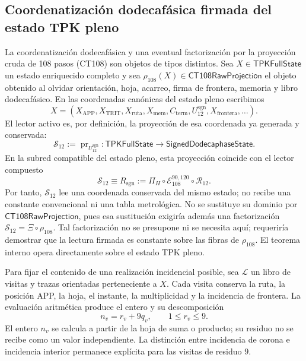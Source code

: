 \subsection{Coordenatización dodecafásica firmada del estado TPK pleno}
\label{subsec:registro-evaluacion-incidencial}

La coordenatización dodecafásica y una eventual factorización por la proyección cruda de
108 pasos (CT108) son objetos de tipos distintos. Sea
\(X\in\mathsf{TPKFullState}\) un estado enriquecido completo y sea
\(\rho_{108}(X)\in\mathsf{CT108RawProjection}\) el objeto obtenido al olvidar
orientación, hoja, acarreo, firma de frontera, memoria y libro dodecafásico.
En las coordenadas canónicas del estado pleno escribimos
\[
 X=(X_{\mathrm{APP}},X_{\mathrm{TRIT}},X_{\mathrm{ruta}},X_{\mathrm{mem}},
       C_{\mathrm{term}},U_{12}^{\mathrm{sgn}},
       X_{\mathrm{frontera}},\ldots).
\]
El lector activo es, por definición, la proyección de esa coordenada ya
generada y conservada:
\[
 \mathcal S_{12}:=\operatorname{pr}_{U_{12}^{\mathrm{sgn}}}:
 \mathsf{TPKFullState}\longrightarrow\mathsf{SignedDodecaphaseState}.
\]
En la subred compatible del estado pleno, esta proyección coincide con el
lector compuesto
\begin{equation}
 \mathcal S_{12}\equiv R_{\mathrm{sgn}}
 :=\Pi_H\circ\mathcal E_{108}^{90,120}\circ\mathcal R_{12}.
 \label{eq:registro-identidad-s12-rsgn}
\end{equation}
Por tanto, \(\mathcal S_{12}\) lee una coordenada conservada del mismo estado;
no recibe una constante
convencional ni una tabla metrológica. No se sustituye su dominio por
\(\mathsf{CT108RawProjection}\), pues esa sustitución exigiría además una
factorización \(\mathcal S_{12}=\Xi\circ\rho_{108}\). Tal factorización no se
presupone ni se necesita aquí; requeriría demostrar que la lectura firmada es
constante sobre las fibras de \(\rho_{108}\). El teorema interno opera
directamente sobre el estado TPK pleno.

Para fijar el contenido de una realización incidencial posible, sea
\(\mathscr L\) un libro de visitas y trazas orientadas perteneciente a
\(X\). Cada visita conserva la ruta, la posición APP, la hoja, el
instante, la multiplicidad y la incidencia de frontera. La evaluación
aritmética produce el entero y su descomposición
\[
 n_v=r_v+9q_v,\qquad 1\leq r_v\leq9.
\]
El entero \(n_v\) se calcula a partir de la hoja de suma o producto; su
residuo no se recibe como un valor independiente. La distinción entre
incidencia de corona e incidencia interior permanece explícita para las
visitas de residuo \(9\).

